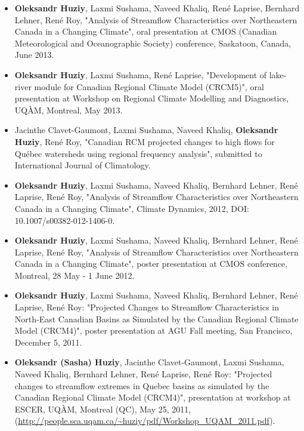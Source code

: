 \documentclass[12pt,a4paper,sans]{moderncv}
\begin{document}
\begin{itemize}
  
  \item \textbf{Oleksandr Huziy}, Laxmi Sushama, Naveed Khaliq, René
  Laprise, Bernhard Lehner, René Roy, "Analysis of Streamflow Characteristics
  over Northeastern Canada in a Changing Climate", oral presentation at
  CMOS (Canadian Meteorological and Oceanographic Society) conference,
  Saskatoon, Canada, June 2013.
  
  \item \textbf{Oleksandr Huziy}, Laxmi Sushama, René Laprise, "Development of
  lake-river module for Canadian Regional Climate Model (CRCM5)", oral
  presentation at Workshop on Regional Climate Modelling and Diagnostics, UQÀM,
  Montreal, May 2013.
  
    \item Jacinthe Clavet-Gaumont, Laxmi Sushama, Naveed Khaliq,
    \textbf{Oleksandr Huziy}, René Roy, "Canadian RCM projected changes to high
    flows for Québec watersheds using regional frequency analysis", submitted to International Journal of Climatology.
    
    \item \textbf{Oleksandr Huziy}, Laxmi Sushama, Naveed Khaliq, Bernhard
    Lehner, René Laprise, René Roy, "Analysis of Streamflow Characteristics over Northeastern Canada 
     in a Changing Climate", Climate Dynamics, 2012, DOI:
     10.1007/s00382-012-1406-0.
    \item \textbf{Oleksandr Huziy}, Laxmi Sushama, Naveed Khaliq, Bernhard Lehner,
     René Laprise, René Roy, "Analysis of Streamflow Characteristics over Northeastern Canada 
     in a Changing Climate", poster presentation at CMOS conference, Montreal,
     28 May - 1 June 2012.
    \item \textbf{Oleksandr Huziy}, Laxmi Sushama, Naveed Khaliq, Bernhard Lehner, René
    Laprise, René Roy: "Projected Changes to Streamflow Characteristics in
    North-East Canadian Basins as Simulated by the Canadian Regional Climate
    Model (CRCM4)", poster presentation at AGU Fall meeting, San Francisco,
    December 5, 2011.
    \item \textbf{Oleksandr (Sasha) Huziy}, Jacinthe Clavet-Gaumont, Laxmi
    Sushama, Naveed Khaliq, Bernhard Lehner, René Laprise, René Roy: "Projected changes to streamflow extremes in Quebec
    basins as simulated by the Canadian Regional Climate Model (CRCM4)",
    presentation at workshop at ESCER, UQÀM, Montreal (QC), May 25, 2011,
    (\url{http://people.sca.uqam.ca/~huziy/pdf/Workshop_UQAM_2011.pdf}).
   

\end{itemize}
\end{document}
